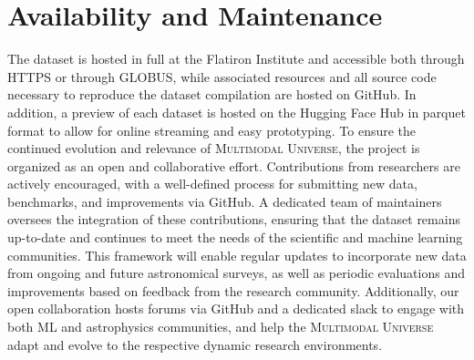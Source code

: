 \documentclass[dvipsnames,table]{article}
\newcommand\pile{\textsc{Multimodal Universe}\xspace}
\begin{document}

\section{Availability and Maintenance}\label{sec: availability and maintenance}
The dataset is hosted in full at the Flatiron Institute and accessible both through HTTPS or through GLOBUS, while associated resources and all source code necessary to reproduce the dataset compilation are hosted on GitHub. In addition, a preview of each dataset is hosted on the Hugging Face Hub in parquet format to allow for online streaming and easy prototyping. 
To ensure the continued evolution and relevance of \pile, the project is organized as an open and collaborative effort. Contributions from researchers are actively encouraged, with a well-defined process for submitting new data, benchmarks, and improvements via GitHub. A dedicated team of maintainers oversees the integration of these contributions, ensuring that the dataset remains up-to-date and continues to meet the needs of the scientific and machine learning communities. This framework will enable regular updates to incorporate new data from ongoing and future astronomical surveys, as well as periodic evaluations and improvements based on feedback from the research community.
Additionally, our open collaboration hosts forums via GitHub and a dedicated slack to engage with both ML and astrophysics communities, and help the \pile adapt and evolve to the respective dynamic research environments.

\end{document}
